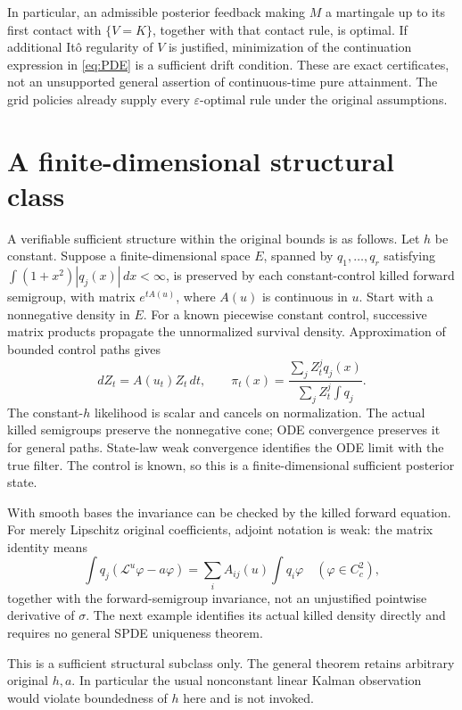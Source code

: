 \documentclass[11pt,a4paper]{article}
\theoremstyle{definition}
\theoremstyle{remark}
\begin{document}
In particular, an admissible posterior feedback making \(M\) a
martingale up to its first contact with \(\{V=K\}\), together with
that contact rule, is optimal. If additional Itô regularity of
\(V\) is justified, minimization of the continuation expression
in \eqref{eq:PDE} is a sufficient drift condition.
These are exact certificates, not an unsupported general assertion
of continuous-time pure attainment. The grid policies already
supply every \(\varepsilon\)-optimal rule under the original assumptions.

\section{A finite-dimensional structural class}

A verifiable sufficient structure within the original bounds is
as follows. Let \(h\) be constant. Suppose a finite-dimensional space
\(E\), spanned by \(q_1,\ldots,q_r\) satisfying
\(\int(1+x^2)|q_j(x)|\,dx<\infty\), is preserved by each
constant-control killed forward semigroup, with matrix
\(e^{tA(u)}\), where \(A(u)\) is continuous in \(u\).
Start with a nonnegative density in \(E\).
For a known piecewise constant control, successive matrix products
propagate the unnormalized survival density. Approximation of
bounded control paths gives
\[
 dZ_t=A(u_t)Z_t\,dt,\qquad
 \pi_t(x)=
 \frac{\sum_jZ_t^jq_j(x)}{\sum_jZ_t^j\int q_j}.
\]
The constant-\(h\) likelihood is scalar and cancels on normalization.
The actual killed semigroups preserve the nonnegative cone;
ODE convergence preserves it for general paths. State-law weak
convergence identifies the ODE limit with the true filter.
The control is known, so this is a finite-dimensional sufficient
posterior state.

With smooth bases the invariance can be checked by the killed
forward equation. For merely Lipschitz original coefficients,
adjoint notation is weak: the matrix identity means
\[
 \int q_j(\mathcal L^u\varphi-a\varphi)
          =\sum_i A_{ij}(u)\int q_i\varphi
       \quad(\varphi\in C_c^2),
\]
together with the forward-semigroup invariance, not an unjustified
pointwise derivative of \(\sigma\). The next example identifies
its actual killed density directly and requires no general SPDE
uniqueness theorem.

This is a sufficient structural subclass only. The general theorem
retains arbitrary original \(h,a\). In particular the usual
nonconstant linear Kalman observation would violate boundedness
of \(h\) here and is not invoked.
\end{document}
